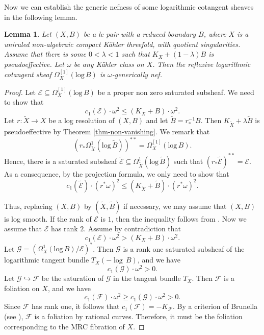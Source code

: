 \documentclass[12pt]{amsart}
\newcommand{\<}{\leq}
\def\>{\geq}
\def\mcE{\mathcal{E}}
\def\mcF{\mathcal{F}}
\def\mcG{\mathcal{G}}
\def\injective{\hookrightarrow}
\newtheorem{lemma}[theorem]{Lemma}
\theoremstyle{remark}
\theoremstyle{definition}
\theoremstyle{definition}
\numberwithin{equation}{section}
\theoremstyle{definition}
\theoremstyle{definition}
\begin{document}
Now we  can establish the generic nefness of some logarithmic cotangent sheaves in the following lemma.
 

\begin{lemma}
\label{lem-orbifold-semi-positivity}
Let $(X,B)$ be a lc pair with a reduced boundary $B$, where $X$ is a  uniruled non-algebraic compact K\"ahler threefold, with quotient singularities. 
Assume that there is some $0<\lambda <1$ such that   $K_X+ (1-\lambda) B$ is pseudoeffective.  
Let $\omega$ be any K\"ahler class on $X$. 
Then the reflexive logarithmic cotangent  sheaf $\Omega_X^{[1]}(\mathrm{log}\, B)$ is $\omega$-generically nef.
\end{lemma}

\begin{proof}
Let $\mathcal{E} \subseteq \Omega_X^{[1]}(\mathrm{log}\, B)$ be a proper non zero saturated subsheaf. 
We need to show that 
\[ {c}_1(\mathcal{E}) \cdot \omega^2 \< (K_X+B)\cdot \omega^2.\] 
Let $r\colon\widetilde{X} \to X$ be a log resolution of $(X,B)$ and let $\widetilde{B} = r^{-1}_*B$. 
Then   $K_{\widetilde{X}}+\lambda \widetilde{B}$ is pseudoeffective by Theorem \ref{thm-non-vanishing}.   
We remark that 
\[
(r_*\Omega_{\widetilde{X}}^1(\mathrm{log}\, \widetilde{B}))^{**} = \Omega_X^{[1]}(\mathrm{log}\, B).
\]
Hence, there is a saturated subsheaf $\widetilde{\mcE} \subseteq \Omega_{\widetilde{X}}^1(\mathrm{log}\, \widetilde{B})$ such that 
$ (r_* \widetilde{\mcE})^{**} = \mcE$.   
As a consequence, by the projection formula,  we only need to show that
\[
c_1(\widetilde{\mathcal{E}}) \cdot (r^*\omega)^2 \< (K_{\widetilde{X}}+\widetilde{B})\cdot (r^*\omega)^2.
\]

Thus, replacing $(X,B)$ by $(\widetilde{X}, \widetilde{B})$  if necessary, we  may assume that $(X,B)$ is log smooth. 
If the rank of $\mcE$ is $1$, then the inequality follows from \cite[Theorem 1.1]{CP16}. 
Now we assume that $\mathcal{E}$ has rank $2$. 
Assume by contradiction that 
\[
c_1({\mathcal{E}}) \cdot  \omega^2 > (K_{X}+ B)\cdot  \omega^2.
\]
Let $\mathcal{G} = (\Omega^{1}_{X}(\mathrm{log}\,  {B}) / \mathcal{E})^*$.  
Then $\mcG$ is a rank one saturated subsheaf of  the logarithmic tangent bundle  $T_{X}(-\log\,  {B})$, and we have 
\[
c_1(\mcG) \cdot  \omega^2 >0.
\] 
Let $\mcG \injective \mcF$ be the saturation of $\mcG$ in the tangent bundle $T_{X}$.  
Then $\mcF$ is a foliation on $X$, and  we have   
\[
c_1( \mcF) \cdot   \omega ^2 \> c_1(\mcG) \cdot   \omega^2 >0.  
\] 
Since $\mcF$ has rank one, it follows that $c_1(\mcF) = -K_{\mcF}$. 
By a criterion of Brunella (see \cite[Theorem 1.1]{Bru06}), $ \mcF $ is a foliation by rational curves.  
Therefore, it must be the foliation corresponding to  the MRC fibration of $X$.  


\end{proof}
\end{document}
